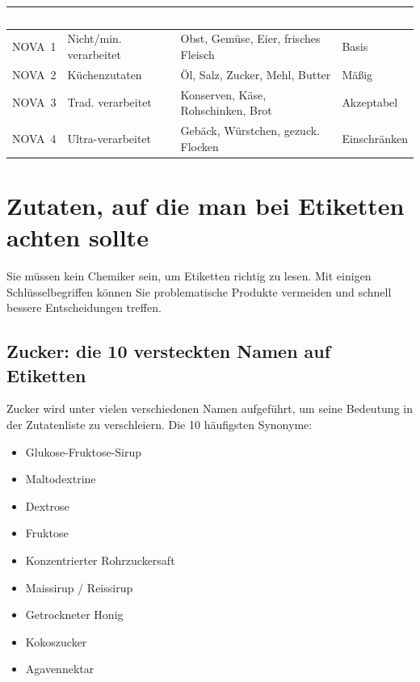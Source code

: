 \documentclass[a5paper,12pt,oneside,openany]{book}
\begin{document}
{\small
\begin{tabularx}{\textwidth}{|l|L|L|l|}
\hline
{}
  \textcolor{white}{\textbf{Gruppe}}
  & \textcolor{white}{\textbf{Definition}}
  & \textcolor{white}{\textbf{Beispiele}}
  & \textcolor{white}{\textbf{Ern\"{a}hrung}} \\
\hline
NOVA~1 & Nicht/min. verarbeitet & Obst, Gem\"{u}se, Eier, frisches Fleisch & Basis \\
\hline
NOVA~2 & K\"{u}chenzutaten & \"{O}l, Salz, Zucker, Mehl, Butter & M\"{a}{\ss}ig \\
\hline
NOVA~3 & Trad. verarbeitet & Konserven, K\"{a}se, Rohschinken, Brot & Akzeptabel \\
\hline
NOVA~4 & Ultra-verarbeitet & Geb\"{a}ck, W\"{u}rstchen, gezuck. Flocken & Einschr\"{a}nken \\
\hline
\end{tabularx}
}

\chapter{Zutaten, auf die man bei Etiketten achten sollte}

Sie m\"{u}ssen kein Chemiker sein, um Etiketten richtig zu lesen. Mit einigen
Schl\"{u}sselbegriffen k\"{o}nnen Sie problematische Produkte vermeiden und
schnell bessere Entscheidungen treffen.

\section{Zucker: die 10 versteckten Namen auf Etiketten}

Zucker wird unter vielen verschiedenen Namen aufgef\"{u}hrt, um seine
Bedeutung in der Zutatenliste zu verschleiern. Die 10 h\"{a}ufigsten Synonyme:

\begin{itemize}
  \item Glukose-Fruktose-Sirup
  \item Maltodextrine
  \item Dextrose
  \item Fruktose
  \item Konzentrierter Rohrzuckersaft
  \item Maissirup / Reissirup
  \item Getrockneter Honig
  \item Kokoszucker
  \item Agavennektar
\end{itemize}
\end{document}
